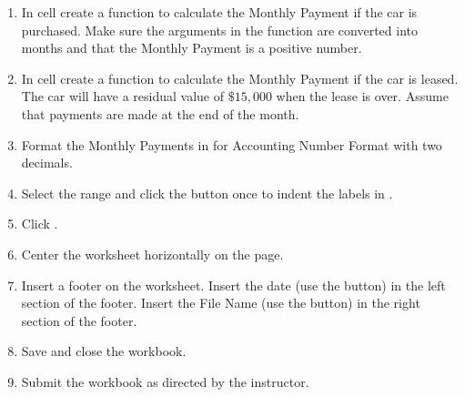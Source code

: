 \begin{enumbox}
\begin{enumerate}
		\item In cell  create a  function to calculate the Monthly Payment if the car is purchased. Make sure the arguments in the  function are converted into months and that the Monthly Payment is a positive number.
		
		\item In cell  create a  function to calculate the Monthly Payment if the car is leased. The car will have a residual value of $ \$15,000 $ when the lease is over. Assume that payments are made at the end of the month.
		
		\item Format the Monthly Payments in  for Accounting Number Format with two decimals.
		
		\item Select the range  and click the  button once to indent the labels in .
		
		\item Click .
		
		\item Center the  worksheet horizontally on the page.
		
		\item Insert a footer on the  worksheet. Insert the date (use the  button) in the left section of the footer. Insert the File Name (use the  button) in the right section of the footer.
		\item Save and close the  workbook.
		\item Submit the  workbook as directed by the instructor.
	\end{enumerate}
\end{enumbox}